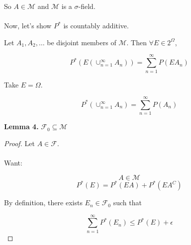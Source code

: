 \documentclass[11pt,fleqn]{book} %
\begin{document}
So $A \in \mathscr{M}$ and $\mathscr{M}$ is a $\sigma$-field. \\
\\

Now, let's show $P^*$ is countably additive.

Let $A_1, A_2, \dots$ be disjoint members of $\mathscr{M}$. Then $\forall E \in 2^\Omega$, 

$$P^*(E(\cup^\infty_{n=1} A_n)) = \displaystyle \sum^\infty_{n=1} P(E A_n) $$

Take $E = \Omega$. 

$$P^*(\cup^\infty_{n=1} A_n) = \displaystyle \sum^\infty_{n=1} P( A_n) $$


\textbf{Lemma 4.} $\mathscr{F}_0 \subseteq \mathscr{M}$

\begin{proof}
	Let $A \in \mathscr{F}$.\\
	\\

	Want:

	$$A \in \mathscr{M} $$
$$P^*(E) = P^*(EA) + P^*(E A^C) $$

By definition, there exists $E_n \in \mathscr{F}_0$ 
such that 

$$\displaystyle \sum^\infty_{n=1} P^*(E_n) \leq P^*(E) + \epsilon $$

 
\end{proof}
\end{document}

